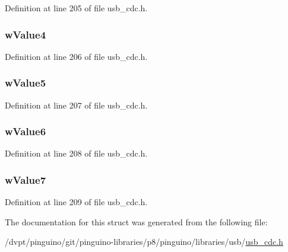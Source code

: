 Definition at line 205 of file usb\-\_\-cdc.\-h.

\hypertarget{struct_zero___packet___length_af1066c1be41a960aa7bbb81885aabc65}{
\subsubsection[{w\-Value4}]{ w\-Value4}}\label{struct_zero___packet___length_af1066c1be41a960aa7bbb81885aabc65}


Definition at line 206 of file usb\-\_\-cdc.\-h.

\hypertarget{struct_zero___packet___length_a56adc69236a996c7580c0f7c34619c80}{
\subsubsection[{w\-Value5}]{ w\-Value5}}\label{struct_zero___packet___length_a56adc69236a996c7580c0f7c34619c80}


Definition at line 207 of file usb\-\_\-cdc.\-h.

\hypertarget{struct_zero___packet___length_a0f411a2df158bdc7c72353da891ed7f8}{
\subsubsection[{w\-Value6}]{ w\-Value6}}\label{struct_zero___packet___length_a0f411a2df158bdc7c72353da891ed7f8}


Definition at line 208 of file usb\-\_\-cdc.\-h.

\hypertarget{struct_zero___packet___length_a0e27992794c44a99ffd301d09cd2ed96}{
\subsubsection[{w\-Value7}]{ w\-Value7}}\label{struct_zero___packet___length_a0e27992794c44a99ffd301d09cd2ed96}


Definition at line 209 of file usb\-\_\-cdc.\-h.



The documentation for this struct was generated from the following file\-:\begin{DoxyCompactItemize}
\item 
/dvpt/pinguino/git/pinguino-\/libraries/p8/pinguino/libraries/usb/\hyperlink{usb__cdc_8h}{usb\-\_\-cdc.\-h}\end{DoxyCompactItemize}
